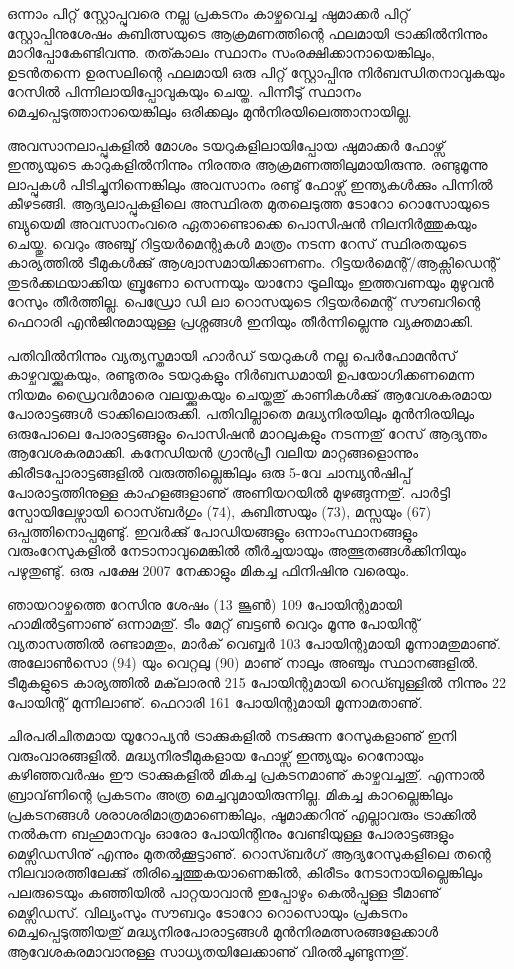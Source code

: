 ഒന്നാം പിറ്റ് സ്റ്റോപ്പുവരെ നല്ല പ്രകടനം കാഴ്ചവെച്ച ഷുമാക്കര്‍ പിറ്റ് സ്റ്റോപ്പിനുശേഷം കുബിത്സയുടെ ആക്രമണത്തിന്റെ 
ഫലമായി ട്രാക്കില്‍നിന്നും മാറിപ്പോകേണ്ടിവന്നു. തത്കാലം സ്ഥാനം സംരക്ഷിക്കാനായെങ്കിലും, ഉടന്‍തന്നെ 
ഉരസലിന്റെ ഫലമായി ഒരു പിറ്റ് സ്റ്റോപ്പിനു നിര്‍ബന്ധിതനാവുകയും റേസില്‍ പിന്നിലായിപ്പോവുകയും ചെയ്ത. പിന്നീടു് 
സ്ഥാനം മെച്ചപ്പെടുത്താനായെങ്കിലും ഒരിക്കലും മുന്‍നിരയിലെത്താനായില്ല.

അവസാനലാപ്പുകളില്‍ മോശം ടയറുകളിലായിപ്പോയ ഷുമാക്കര്‍ ഫോഴ്സ് ഇന്ത്യയുടെ കാറുകളില്‍നിന്നും നിരന്തര 
ആക്രമണത്തിലുമായിരുന്നു. രണ്ടുമൂന്നു ലാപ്പുകള്‍ പിടിച്ചുനിന്നെങ്കിലും അവസാനം രണ്ടു് ഫോഴ്സ് ഇന്ത്യകള്‍ക്കും പിന്നില്‍ 
കീഴടങ്ങി. ആദ്യലാപ്പുകളിലെ അസ്ഥിരത മുതലെടുത്ത ടോറോ റൊസോയുടെ ബ്യുയെമി അവസാനംവരെ 
ഏതാണ്ടൊക്കെ പൊസിഷന്‍ നിലനിര്‍ത്തുകയും ചെയ്തു. വെറും അഞ്ചു് റിട്ടയര്‍മെന്റുകള്‍ മാത്രം നടന്ന റേസ് 
സ്ഥിരതയുടെ കാര്യത്തില്‍ ടീമുകള്‍ക്കു് ആശ്വാസമായിക്കാണണം. റിട്ടയര്‍മെന്റ്/ആക്സിഡെന്റ് തുടര്‍ക്കഥയാക്കിയ 
ബ്രൂണോ സെന്നയും യാനോ ട്രൂലിയും ഇത്തവണയും മുഴുവന്‍ റേസും തീര്‍ത്തില്ല. പെഡ്രോ ഡി ലാ റൊസയുടെ 
റിട്ടയര്‍മെന്റ് സൗബറിന്റെ ഫെറാരി എന്‍ജിനുമായുള്ള പ്രശ്നങ്ങള്‍ ഇനിയും തീര്‍ന്നില്ലെന്നു വ്യക്തമാക്കി.

പതിവില്‍നിന്നും വ്യത്യസ്തമായി ഹാര്‍ഡ് ടയറുകള്‍ നല്ല പെര്‍ഫോമന്‍സ് കാഴ്ചവയ്ക്കുകയും, രണ്ടുതരം ടയറുകളും 
നിര്‍ബന്ധമായി ഉപയോഗിക്കണമെന്ന നിയമം ഡ്രൈവര്‍മാരെ വലയ്ക്കുകയും ചെയ്തതു് കാണികള്‍ക്കു് ആവേശകരമായ 
പോരാട്ടങ്ങള്‍ ട്രാക്കിലൊരുക്കി. പതിവില്ലാതെ മദ്ധ്യനിരയിലും മുന്‍നിരയിലും ഒരുപോലെ പോരാട്ടങ്ങളും പൊസിഷന്‍ 
മാറലുകളും നടന്നതു് റേസ് ആദ്യന്തം ആവേശകരമാക്കി. കനേഡിയന്‍ ഗ്രാന്‍പ്രീ വലിയ മാറ്റങ്ങളൊന്നും 
കിരീടപ്പോരാട്ടങ്ങളില്‍ വരുത്തില്ലെങ്കിലും ഒരു 5-വേ ചാമ്പ്യന്‍ഷിപ്പ് പോരാട്ടത്തിനുള്ള കാഹളങ്ങളാണു് അണിയറയില്‍ മുഴങ്ങുന്നതു്. 
പാര്‍ട്ടി സ്പോയിലേഴ്സായി റൊസ്ബര്‍ഗും (74), കുബിത്സയും (73), മസ്സയും (67) ഒപ്പത്തിനൊപ്പമുണ്ടു്. 
ഇവര്‍ക്കു് പോഡിയങ്ങളും ഒന്നാംസ്ഥാനങ്ങളും വരുംറേസുകളില്‍ നേടാനാവുമെങ്കില്‍ തീര്‍ച്ചയായും അത്ഭുതങ്ങള്‍ക്കിനിയും
പഴുതുണ്ടു്. ഒരു പക്ഷേ 2007 നേക്കാളും മികച്ച ഫിനിഷിനു വരെയും.

ഞായറാഴ്ചത്തെ റേസിനു ശേഷം (13 ജൂണ്‍) 109 പോയിന്റുമായി ഹാമില്‍ട്ടണാണു് ഒന്നാമതു്. ടീം മേറ്റ് ബട്ടണ്‍ വെറും 
മൂന്നു പോയിന്റ് വ്യതാസത്തില്‍ രണ്ടാമതും, മാര്‍ക് വെബ്ബര്‍ 103 പോയിന്റുമായി മൂന്നാമതുമാണു്. അലോണ്‍സൊ (94) യും വെറ്റലു (90) മാണു് 
നാലും അഞ്ചും സ്ഥാനങ്ങളില്‍. ടീമുകളുടെ കാര്യത്തില്‍ മക്‌ലാരന്‍ 215 പോയിന്റുമായി 
റെഡ്ബുള്ളില്‍ നിന്നും 22 പോയിന്റ് മുന്നിലാണു്. ഫെറാരി 161 പോയിന്റുമായി മൂന്നാമതാണു്.

ചിരപരിചിതമായ യൂറോപ്യന്‍ ട്രാക്കുകളില്‍ നടക്കുന്ന റേസുകളാണു് ഇനി വരുംവാരങ്ങളില്‍. മദ്ധ്യനിരടീമുകളായ ഫോഴ്സ്
ഇന്ത്യയും റെനോയും കഴിഞ്ഞവര്‍ഷം ഈ ട്രാക്കുകളില്‍ മികച്ച പ്രകടനമാണു് കാഴ്ചവച്ചതു്. എന്നാല്‍ ബ്രാവ്‌ണിന്റെ 
പ്രകടനം അത്ര മെച്ചവുമായിരുന്നില്ല. മികച്ച കാറല്ലെങ്കിലും പ്രകടനങ്ങള്‍ ശരാശരിമാത്രമാണെങ്കിലും, ഷൂമാക്കറിനു് 
എല്ലാവരും ട്രാക്കില്‍ നല്‍കുന്ന ബഹുമാനവും ഓരോ പോയിന്റിനും വേണ്ടിയുള്ള പോരാട്ടങ്ങളും മെഴ്സിഡസിനു് എന്നും 
മുതല്‍ക്കൂട്ടാണു്. റൊസ്ബര്‍ഗ് ആദ്യറേസുകളിലെ തന്റെ നിലവാരത്തിലേക്കു് തിരിച്ചെത്തുകയാണെങ്കില്‍, കിരീടം 
നേടാനായില്ലെങ്കിലും പലരുടെയും കഞ്ഞിയില്‍ പാറ്റയാവാന്‍ ഇപ്പോഴും കെല്‍പ്പുള്ള ടീമാണു് മെഴ്സിഡസ്. വില്യംസും 
സൗബറും ടോറോ റൊസൊയും പ്രകടനം മെച്ചപ്പെടുത്തിയതു് മദ്ധ്യനിരപോരാട്ടങ്ങള്‍ മുന്‍നിരമത്സരങ്ങളേക്കാള്‍ 
ആവേശകരമാവാനുള്ള സാധ്യതയിലേക്കാണു് വിരല്‍ചൂണ്ടുന്നതു്.

